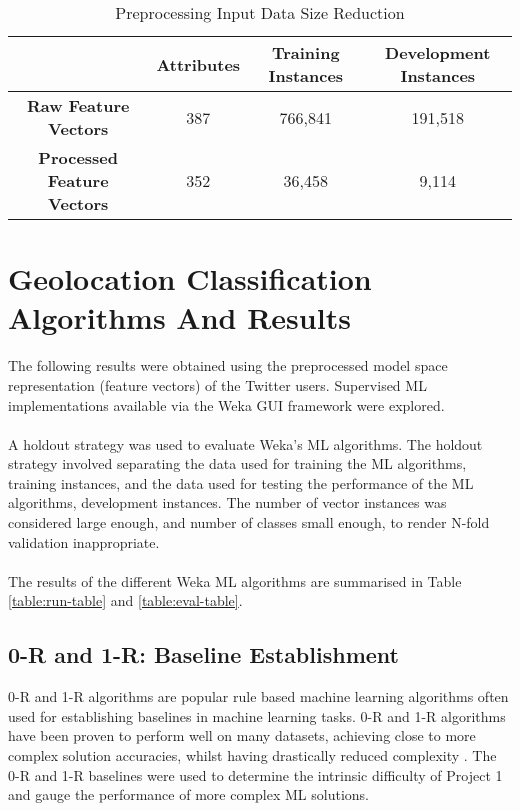 \documentclass[11pt]{article}
\begin{document}
\begin{table} [th]
\caption{Preprocessing Input Data Size Reduction}
\centering
	\begin{tabular}{| c | c | c | c |}
	\hline
	 & \textbf{Attributes} & \textbf{Training Instances} & \textbf{Development Instances}  \\
	\hline
	\textbf{Raw Feature Vectors} & 387 & 766,841 & 191,518\\
	\hline
	\textbf{Processed Feature Vectors} & 352 & 36,458 & 9,114\\
	\hline
	\end{tabular}
\label{table:input-table}
\end{table}

\section{Geolocation Classification Algorithms And Results}

The following results were obtained using the preprocessed model space representation (feature vectors) of the Twitter users. Supervised ML implementations available via the Weka GUI framework were explored. \\\\
A holdout strategy was used to evaluate Weka's ML algorithms. The holdout strategy involved separating the data used for training the ML algorithms, training instances, and the data used for testing the performance of the ML algorithms, development instances. The number of vector instances was considered large enough, and number of classes small enough, to render N-fold validation inappropriate.\\\\
The results of the different Weka ML algorithms are summarised in Table \ref{table:run-table} and \ref{table:eval-table}.

\subsection{0-R and 1-R: Baseline Establishment}   

0-R and 1-R algorithms are popular rule based machine learning algorithms often used for establishing baselines in machine learning tasks. 0-R and 1-R algorithms have been proven to perform well on many datasets, achieving close to more complex solution accuracies, whilst having drastically reduced complexity \cite{holte-1R}. The 0-R and 1-R baselines were used to determine the intrinsic difficulty of Project 1 and gauge the performance of more complex ML solutions.
\end{document}
